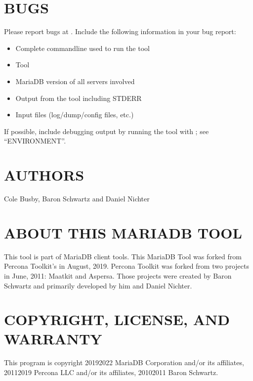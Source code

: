 \documentclass[letterpaper,10pt,english]{sphinxmanual}
\begin{document}
\section{BUGS}
\label{\detokenize{mariadb-config-diff:bugs}}
Please report bugs at .
Include the following information in your bug report:
\begin{itemize}
\item {} 
Complete command\sphinxhyphen{}line used to run the tool

\item {} 
Tool {\hyperref[\detokenize{mariadb-config-diff:cmdoption-mariadb-config-diff-version}]{}}

\item {} 
MariaDB version of all servers involved

\item {} 
Output from the tool including STDERR

\item {} 
Input files (log/dump/config files, etc.)

\end{itemize}

If possible, include debugging output by running the tool with ;
see “ENVIRONMENT”.


\section{AUTHORS}
\label{\detokenize{mariadb-config-diff:authors}}
Cole Busby, Baron Schwartz and Daniel Nichter


\section{ABOUT THIS MARIADB TOOL}
\label{\detokenize{mariadb-config-diff:about-this-mariadb-tool}}
This tool is part of MariaDB client tools. This MariaDB Tool was forked from
Percona Toolkit’s  in August, 2019. Percona Toolkit was forked from two
projects in June, 2011: Maatkit and Aspersa.  Those projects were created by
Baron Schwartz and primarily developed by him and Daniel Nichter.


\section{COPYRIGHT, LICENSE, AND WARRANTY}
\label{\detokenize{mariadb-config-diff:copyright-license-and-warranty}}
This program is copyright 2019\sphinxhyphen{}2022 MariaDB Corporation and/or its affiliates,
2011\sphinxhyphen{}2019 Percona LLC and/or its affiliates, 2010\sphinxhyphen{}2011 Baron Schwartz.
\end{document}
